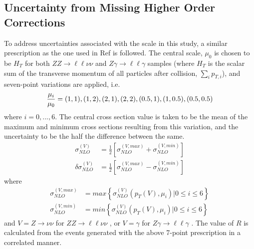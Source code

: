 \documentclass[12pt,a4paper,openright,twoside]{report}
\newcommand{\ZZ}{$ZZ\to \ell\ell\nu\nu$ }
\newcommand{\Zg}{$Z\gamma\to \ell\ell\gamma$ }
\begin{document}
\subsection{Uncertainty from Missing Higher Order Corrections}
To address uncertainties associated with the scale in this study, a similar prescription as the one used in Ref \cite{precise_scale} is followed. The central scale, $\mu_0$ is chosen to be $H_{T}$ for both \ZZ and \Zg samples (where $H_T$ is the scalar sum of the transverse momentum of all particles after collision, $\sum_{i} p_{T,i}$), and seven-point variations are applied, i.e.
\begin{equation}
\frac{\mu_i}{\mu_0} = (1,1),(1,2),(2,1),(2,2),(0.5,1),(1,0.5),(0.5,0.5)\\
\label{eq:scale}
\end{equation}
where $i=0,...,6$. The central cross section value is taken to be the mean of the maximum and minimum cross sections resulting from this variation, and the uncertainty to be the half the difference between the same.
\begin{align}
\sigma_{NLO}^{(V)} &= \frac{1}{2}\left[\sigma_{NLO}^{(V,max)} + \sigma_{NLO}^{(V,min)}\right]\label{eq:scale_central}\\
\delta\sigma_{NLO}^{(V)} &= \frac{1}{2}\left[\sigma_{NLO}^{(V,max)} - \sigma_{NLO}^{(V,min)}\right]\label{eq:scale_central2}
\end{align}
where
\begin{align}
\sigma_{NLO}^{(V,max)} &= max\left\lbrace\sigma_{NLO}^{(V)}(p_{T}(V),\mu_i)|0\leq i \leq 6\right\rbrace\\
\sigma_{NLO}^{(V,min)} &= min\left\lbrace\sigma_{NLO}^{(V)}(p_{T}(V),\mu_i)|0\leq i \leq 6\right\rbrace
\end{align}
and $V = Z\to\nu\nu$ for \ZZ, or $V = \gamma$ for \Zg. The value of $R$ is calculated from the events generated with the above 7-point prescription in a correlated manner.
\end{document}
